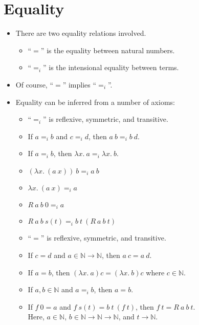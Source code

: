 \documentclass[10pt]{article}
\begin{document}
	\section{Equality}

  \begin{itemize}	
    \item There are two equality relations involved.
      \begin{itemize}
        \item ``$=$'' is the equality between natural numbers.
        \item ``$=_i$'' is the intensional equality between terms.
      \end{itemize}
      
    \item Of course, ``$=$'' implies ``$=_i$''.
    
    \item Equality can be inferred from a number of axioms:
      \begin{itemize}
        \item ``$=_i$'' is reflexive, symmetric, and transitive.
        \item If $a =_i b$ and $c = _i d$, then $a\ b =_i b\ d$.
        \item If $a =_i b$, then $\lambda x.\ a =_i \lambda x.\ b$.
        \item $(\lambda x.\ (a\ x))\ b =_i a\ b$
        \item $\lambda x.\ (a\ x) =_i a$
        \item $R\ a\ b\ 0 =_i a$
        \item $R\ a\ b\ s(t) =_i b\ t\ (R\ a\ b\ t)$
        \item ``$=$'' is reflexive, symmetric, and transitive.
        \item If $c = d$ and $a \in \mathbb{N} \rightarrow \mathbb{N}$, then $a\ c = a\ d$.
        \item If $a = b$, then $(\lambda x.\ a) c = (\lambda x.\ b) c$ where $c \in \mathbb{N}$.
        \item If $a, b \in \mathbb{N}$ and $a =_i b$, then $a = b$.
        \item If $f\ 0 = a$ and $f\ s(t) = b\ t\ (f\ t)$, then $f\ t = R\ a\ b\ t$.\\
          Here, $a \in \mathbb{N}$, $b \in \mathbb{N} \rightarrow \mathbb{N} \rightarrow \mathbb{N}$, and $t \rightarrow \mathbb{N}$.
      \end{itemize}
  \end{itemize}
  
\end{document}

